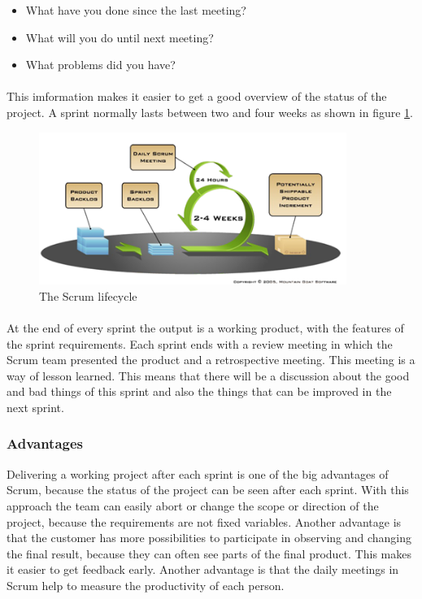 \begin{itemize}
  \item What have you done since the last meeting?
  \item What will you do until next meeting?
  \item What problems did you have?
\end{itemize}

\paragraph{} This imformation makes it easier to get a good overview of the status of the project. A sprint normally lasts between two and four weeks as shown in figure \ref{fig:PrelimMethodScrumLife}.

\begin{figure}[ht!]
  \centering
  \includegraphics[width=100mm]{./PreliminaryStudies/img/scrum2.png}
  \caption{The Scrum lifecycle}
  \label{fig:PrelimMethodScrumLife}
\end{figure}

\paragraph{} At the end of every sprint the output is a working product, with the features of the sprint requirements. Each sprint ends with a review meeting in which the Scrum team presented the product and a retrospective meeting. This meeting is a way of lesson learned. This means that there will be a discussion about the good and bad things of this sprint and also the things that can be improved in the next sprint.

\subsubsection{Advantages}
Delivering a working project after each sprint is one of the big advantages of Scrum, because the status of the project can be seen after each sprint. With this approach the team can easily abort or change the scope or direction of the project, because the requirements are not fixed variables. Another advantage is that the customer has more possibilities to participate in observing and changing the final result, because they can often see parts of the final product. This makes it easier to get feedback early. Another advantage is that the daily meetings in Scrum help to measure the productivity of each person.

